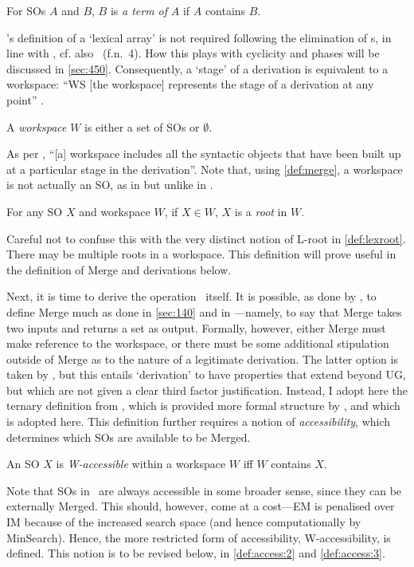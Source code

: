 \begin{definition}
    For SOs $A$ and $B$, $B$ is \textit{a term of} $A$ if $A$ contains $B$.
\end{definition}
\noindent
\CS's definition of a `lexical array' is not required following the elimination of \LIk s, in line with \textcite{ChomskyN.etal_2019}, cf. also \CS\ (f.n.~4). How this plays with cyclicity and phases will be discussed in \autoref{sec:450}. Consequently, a `stage' of a derivation is equivalent to a workspace: ``WS [the workspace] represents the stage of a derivation at any point'' \parencite[245]{ChomskyN.etal_2019}.

\begin{definition}
    A \textit{workspace} $W$ is either a set of SOs or $\emptyset$.
\end{definition}
\noindent
As per \CS[47], ``[a] workspace includes all the syntactic objects that have been built up at a particular stage in the derivation''. Note that, using \autoref{def:merge}, a workspace is not actually an SO, as in \textcite[37]{ChomskyN_2020a} but unlike in \CS.

\begin{definition}\label{def:root}
    For any SO $X$ and workspace $W$, if $X \in W$, $X$ is a \textit{root} in $W$.
\end{definition}
\noindent
Careful not to confuse this with the very distinct notion of L-root in \autoref{def:lexroot}. There may be multiple roots in a workspace. This definition will prove useful in the definition of Merge and derivations below.

Next, it is time to derive the operation \Merge\ itself. It is possible, as done by \CS, to define Merge much as done in \autoref{sec:140} and in ---namely, to say that Merge takes two inputs and returns a set as output. Formally, however, either Merge must make reference to the workspace, or there must be some additional stipulation outside of Merge as to the nature of a legitimate derivation. The latter option is taken by \CS, but this entails `derivation' to have properties that extend beyond UG, but which are not given a clear third factor justification. Instead, I adopt here the ternary definition from \textcite{ChomskyN_2021}, which is provided more formal structure by \textcite{SeelyTD_2021}, and which is adopted here. This definition further requires a notion of \textit{accessibility}, which determines which SOs are available to be Merged.

\begin{definition}\label{def:access:1}
    An SO $X$ is \textit{W-accessible} within a workspace $W$ iff $W$ contains $X$.
\end{definition}
\noindent
Note that SOs in \LEX\ are always accessible in some broader sense, since they can be externally Merged. This should, however, come at a cost---EM is penalised over IM because of the increased search space (and hence computationally by MinSearch). Hence, the more restricted form of accessibility, W-accessibility, is defined. This notion is to be revised below, in \autoref{def:access:2} and \autoref{def:access:3}.

